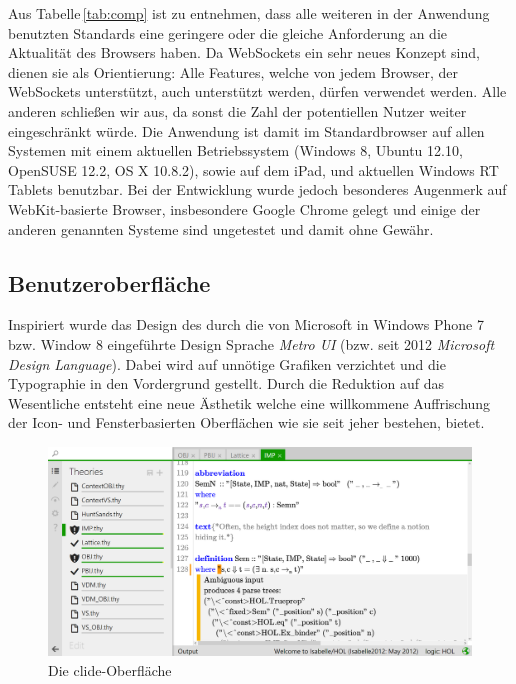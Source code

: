 
Aus Tabelle\,\ref{tab:comp} ist zu entnehmen, dass alle weiteren in der Anwendung benutzten
Standards eine geringere oder die gleiche Anforderung an die Aktualität des Browsers haben. Da
WebSockets ein sehr neues Konzept sind,  dienen sie als Orientierung: Alle Features, welche von
jedem Browser, der WebSockets unterstützt, auch unterstützt werden, dürfen verwendet werden. Alle
anderen schließen wir aus, da sonst die Zahl der potentiellen Nutzer weiter eingeschränkt würde. Die
Anwendung ist damit im Standardbrowser auf allen Systemen mit einem aktuellen Betriebssystem
(Windows 8, Ubuntu 12.10, OpenSUSE 12.2, OS X 10.8.2), sowie auf dem iPad, und aktuellen Windows RT
Tablets benutzbar. Bei der Entwicklung wurde jedoch besonderes Augenmerk auf WebKit-basierte
Browser, insbesondere Google Chrome gelegt und einige der anderen genannten Systeme sind ungetestet
und damit ohne Gewähr.

\subsection{Benutzeroberfläche}

Inspiriert wurde das Design des  durch die von Microsoft in Windows Phone 7 bzw. Window 8
eingeführte Design Sprache \textit{Metro UI} (bzw. seit 2012 \textit{Microsoft Design Language}).
\cite{metroui} Dabei wird auf unnötige Grafiken verzichtet und die Typographie in den Vordergrund
gestellt. Durch die Reduktion auf das Wesentliche entsteht eine neue Ästhetik welche eine
willkommene Auffrischung der Icon- und Fensterbasierten Oberflächen wie sie seit jeher bestehen,
bietet.

\begin{figure}[ht]
\includegraphics[width=\linewidth]{images/screen-main}
  \caption{Die clide-Oberfläche}
  \label{fig:screen-main}
\end{figure}

